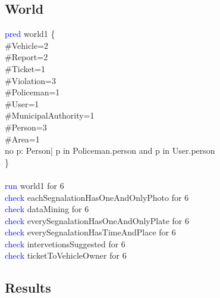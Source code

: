 \subsection{World}
\textcolor{blue}{pred}
\textcolor{mycolor}{world1} \{\\
\#Vehicle=2\\
\#Report=2\\
\#Ticket=1\\
\#Violation=3\\
\#Policeman=1\\
\#User=1\\
\#MunicipalAuthority=1\\
\#Person=3\\
\#Area=1\\

no p: Person| p in Policeman.person and p in User.person\\
\}\\
\\
\textcolor{blue}{run} world1 for 6\\
\textcolor{blue}{check}
\textcolor{mycolor}{eachSegnalationHasOneAndOnlyPhoto} for 6\\
\textcolor{blue}{check}
\textcolor{mycolor}{dataMining} for 6\\
\textcolor{blue}{check}
\textcolor{mycolor}{everySegnalationHasOneAndOnlyPlate} for 6\\
\textcolor{blue}{check}
\textcolor{mycolor}{everySegnalationHasTimeAndPlace} for 6\\
\textcolor{blue}{check}
\textcolor{mycolor}{intervetionsSuggested} for 6\\
\textcolor{blue}{check}
\textcolor{mycolor}{ticketToVehicleOwner} for 6\\
\newpage
\subsection{Results}
